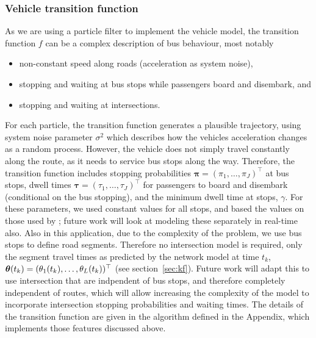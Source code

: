 \subsubsection{Vehicle transition function}
\label{sec:pf_prediction}
As we are using a particle filter to implement the vehicle model,
the transition function $f$ can be a complex description of bus behaviour,
most notably
\begin{itemize}
\item non-constant speed along roads (acceleration as system noise),
\item stopping and waiting at bus stops while passengers board and disembark, and
\item stopping and waiting at intersections.
\end{itemize}

For each particle, the transition function generates a plausible trajectory,
using system noise parameter $\sigma^2$ which describes 
how the vehicles acceleration changes as a random process.
However, the vehicle does not simply travel constantly along the route,
as it needs to service bus stops along the way.
Therefore, the transition function includes 
stopping probabilities $\boldsymbol\pi = (\pi_1,\ldots,\pi_J)^\top$ at bus stops,
dwell times $\boldsymbol\tau = (\tau_1,\ldots,\tau_J)^\top$ for passengers to
board and disembark (conditional on the bus stopping),
and the minimum dwell time at stops, $\gamma$.
For these parameters, we used constant values for all stops,
and based the values on those used by \cite{Hans_2015};
future work will look at modeling these separately in real-time also.
Also in this application, due to the complexity of the problem,
we use bus stops to define road segments.
Therefore no intersection model is required,
only the segment travel times as predicted by the network model at time $t_k$,
$\boldsymbol{\theta}(t_k) = (\theta_1(t_k), \ldots, \theta_L(t_k))^\top$
(see section~\ref{sec:kf}).
Future work will adapt this to use intersection that are indpendent 
of bus stops, and therefore completely independent of routes,
which will allow increasing the complexity of the model to incorporate
intersection stopping probabilities and waiting times.
The details of the transition function are given in the algorithm defined in the Appendix,
which implements those features discussed above.



